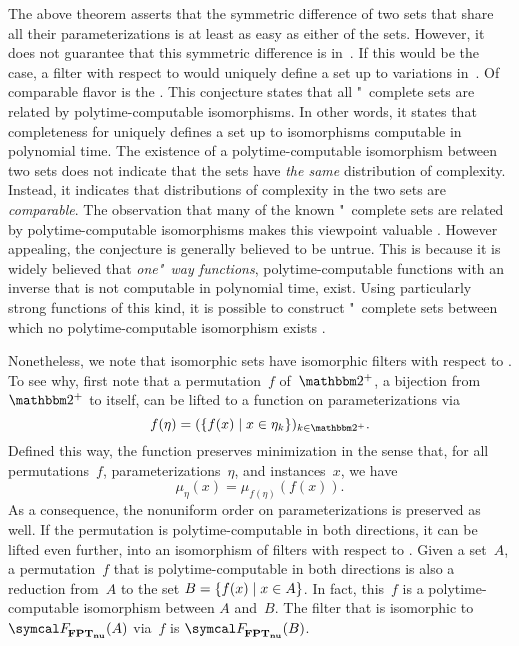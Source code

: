 The above theorem asserts that the symmetric difference of two sets that share all their parameterizations is at least as easy as either of the sets.
However, it does not guarantee that this symmetric difference is in~.
If this would be the case, a filter with respect to  would uniquely define a set up to variations in~.
Of comparable flavor is the  \parencite{berman1977isomorphisms}.
This conjecture states that all "~complete sets are related by polytime-computable isomorphisms.
In other words, it states that completeness for  uniquely defines a set up to isomorphisms computable in polynomial time.
The existence of a polytime-computable isomorphism between two sets does not indicate that the sets have \emph{the same} distribution of complexity.
Instead, it indicates that distributions of complexity in the two sets are \emph{comparable}.
The observation that many of the known "~complete sets are related by polytime-computable isomorphisms makes this viewpoint valuable \parencite{berman1977isomorphisms,goldsmith1996scalability}.
However appealing, the conjecture is generally believed to be untrue.
This is because it is widely believed that \emph{one"~way functions}, polytime-computable functions with an inverse that is not computable in polynomial time, exist.
Using particularly strong functions of this kind, it is possible to construct "~complete sets between which no polytime-computable isomorphism exists \parencite{young1983some,kurtz1989isomorphism,hartmanis1991one,agrawal2009one}.

Nonetheless, we note that isomorphic sets have isomorphic filters with respect to .
To see why, first note that a permutation~$f$ of~$\binary^+$, a bijection from $\binary^+$ to itself, can be lifted to a function on parameterizations via
\begin{equation*}
  f(\eta) = (\{f(x) \st x \in \eta_k\})_{k \in \binary^+}.
\end{equation*}
Defined this way, the function preserves minimization in the sense that, for all permutations~$f$, parameterizations~$\eta$, and instances~$x$, we have
\begin{equation*}
  \mu_\eta(x) = \mu_{f(\eta)}(f(x)).
\end{equation*}
As a consequence, the nonuniform order on parameterizations is preserved as well.
If the permutation is polytime-computable in both directions, it can be lifted even further, into an isomorphism of filters with respect to .
Given a set~$A$, a permutation~$f$ that is polytime-computable in both directions is also a reduction from~$A$ to the set $B = \{f(x) \;|\; x \in A\}$.
In fact, this~$f$ is a polytime-computable isomorphism between $A$ and~$B$.
The filter that is isomorphic to $\calF_\clnu{FPT}(A)$ via~$f$ is $\calF_\clnu{FPT}(B)$.

